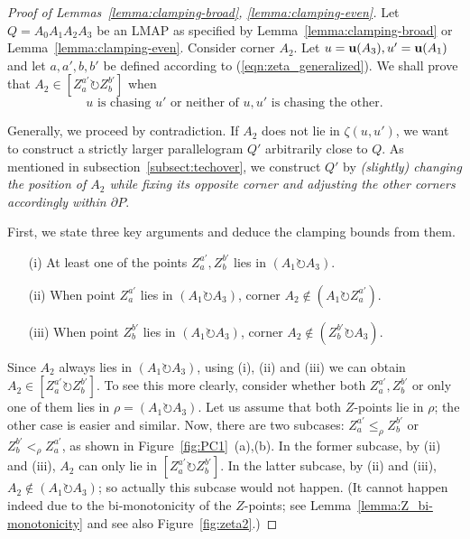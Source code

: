 \documentclass{ws-ijcga}
\begin{document}
\begin{proof}[Proof of Lemmas~\ref{lemma:clamping-broad}, \ref{lemma:clamping-even}]
Let $Q=A_0A_1A_2A_3$ be an LMAP as specified by Lemma~\ref{lemma:clamping-broad} or Lemma~\ref{lemma:clamping-even}.
Consider corner $A_2$.
Let $u=\mathbf{u}(A_3),u'=\mathbf{u}(A_1)$ and let $a,a',b,b'$ be defined according to (\ref{eqn:zeta_generalized}).
We shall prove that $A_2\in [Z_a^{a'}\circlearrowright Z_b^{b'}]$ when
\begin{equation}\label{eqn:broad-or-even}
\text{$u$ is chasing $u'$ or neither of $u,u'$ is chasing the other.}
\end{equation}

Generally, we proceed by contradiction. If $A_2$ does not lie in $\zeta(u,u')$, we want to construct a strictly larger parallelogram $Q'$ arbitrarily close to $Q$.
As mentioned in subsection~\ref{subsect:techover}, we construct $Q'$ by \emph{(slightly) changing the position of $A_2$ while fixing its opposite corner and adjusting the other corners accordingly within $\partial P$}.\smallskip

First, we state three key arguments and deduce the clamping bounds from them.
\begin{enumerate}
\item[(i)] At least one of the points $Z_a^{a'},Z_b^{b'}$ lies in $(A_1\circlearrowright A_3)$.
\item[(ii)] When point $Z_a^{a'}$ lies in $(A_1 \circlearrowright A_3)$, corner $A_2\notin (A_1 \circlearrowright Z_a^{a'})$.
\item[(iii)] When point $Z_b^{b'}$ lies in $(A_1 \circlearrowright A_3)$, corner $A_2\notin (Z_b^{b'} \circlearrowright A_3)$.
\end{enumerate}

Since $A_2$ always lies in $(A_1\circlearrowright A_3)$, using (i), (ii) and (iii) we can obtain $A_2\in [Z_a^{a'}\circlearrowright Z_b^{b'}]$.
To see this more clearly, consider whether both $Z_a^{a'},Z_b^{b'}$ or only one of them lies in $\rho=(A_1\circlearrowright A_3)$.
Let us assume that both $Z$-points lie in $\rho$; the other case is easier and similar.
Now, there are two subcases: $Z_a^{a'}\leq_\rho Z_b^{b'}$ or $Z_b^{b'}<_\rho Z_a^{a'}$,
  as shown in Figure~\ref{fig:PC1}~(a),(b).
In the former subcase, by (ii) and (iii), $A_2$ can only lie in $[Z_a^{a'}\circlearrowright Z_b^{b'}]$.
In the latter subcase, by (ii) and (iii), $A_2\notin (A_1\circlearrowright A_3)$; so actually this subcase would not happen.
(It cannot happen indeed due to the bi-monotonicity of the $Z$-points; see Lemma~\ref{lemma:Z_bi-monotonicity} and see also Figure~\ref{fig:zeta2}.)


\end{proof}
\end{document}
